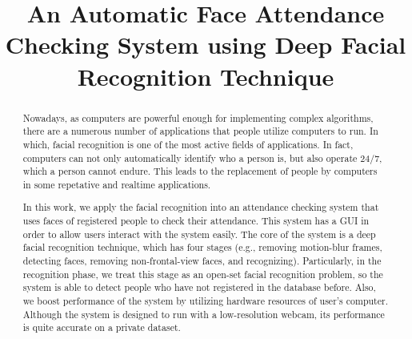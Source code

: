 \documentclass[journal, twocolumn]{IEEEtran}
\begin{document}
\title{An Automatic Face Attendance Checking System using Deep Facial Recognition Technique}


%


\maketitle


\begin{abstract}
Nowadays, as computers are powerful enough for implementing complex algorithms, there are a numerous number of applications that people utilize computers to run. In which, facial recognition is one of the most active fields of applications. In fact, computers can not only automatically identify who a person is, but also operate 24/7, which a person cannot endure. This leads to the replacement of people by computers in some repetative and realtime applications.

In this work, we apply the facial recognition into an attendance checking system that uses faces of registered people to check their attendance. This system has a GUI in order to allow users interact with the system easily. The core of the system is a deep facial recognition technique, which has four stages (e.g., removing motion-blur frames, detecting faces, removing non-frontal-view faces, and recognizing). Particularly, in the recognition phase, we treat this stage as an open-set facial recognition problem, so the system is able to detect people who have not registered in the database before. Also, we boost performance of the system by utilizing hardware resources of user's computer. Although the system is designed to run with a low-resolution webcam, its performance is  quite accurate on a private dataset.
\end{abstract}
\end{document}
